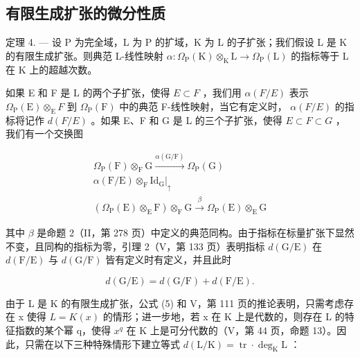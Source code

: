 \subsection{有限生成扩张的微分性质}

定理 4. --- 设 P 为完全域，L 为 P 的扩域，K 为 L 的子扩张；我们假设 L 是 K 的有限生成扩张。则典范 L-线性映射 \(\alpha: \Omega_{\mathrm{P}}(\mathrm{K}) \otimes_{\mathrm{K}} \mathrm{L} \to \Omega_{\mathrm{P}}(\mathrm{L})\) 的指标等于 L 在 K 上的超越次数。

如果 E 和 F 是 L 的两个子扩张，使得 \(E \subset F\) ，我们用 \(\alpha(F/E)\) 表示 \(\Omega_{\mathrm{P}}(\mathrm{E}) \otimes_{\mathrm{E}} F\) 到 \(\Omega_{\mathrm{P}}(\mathrm{F})\) 中的典范 F-线性映射，当它有定义时， \(\alpha(F/E)\) 的指标将记作 \(d(F/E)\) 。如果 E、F 和 G 是 L 的三个子扩张，使得 \(E \subset F \subset G\) ，我们有一个交换图

\[
\begin{array}{c} \Omega_ {\mathrm{P}} (\mathrm{F}) \otimes_ {\mathrm{F}} \mathrm{G} \xrightarrow {\alpha (\mathrm{G} / \mathrm{F})} \Omega_ {\mathrm{P}} (\mathrm{G}) \\ \alpha (\mathrm{F} / \mathrm{E}) \otimes_ {\mathrm{F}} \mathrm{Id} _ {\mathrm{G}} \Bigg | _ {\uparrow} \\ (\Omega_ {\mathrm{P}} (\mathrm{E}) \otimes_ {\mathrm{E}} \mathrm{F}) \otimes_ {\mathrm{F}} \mathrm{G} \xrightarrow {\beta} \Omega_ {\mathrm{P}} (\mathrm{E}) \otimes_ {\mathrm{E}} \mathrm{G} \end{array}
\]

其中 \(\beta\) 是命题 2（II，第 278 页）中定义的典范同构。由于指标在标量扩张下显然不变，且同构的指标为零，引理 2（V，第 133 页）表明指标 \(d(\mathrm{G}/\mathrm{E})\) 在 \(d(\mathrm{F}/\mathrm{E})\) 与 \(d(\mathrm{G}/\mathrm{F})\) 皆有定义时有定义，并且此时

\[
d (\mathrm{G} / \mathrm{E}) = d (\mathrm{G} / \mathrm{F}) + d (\mathrm{F} / \mathrm{E}).\tag{5}
\]

由于 L 是 K 的有限生成扩张，公式 (5) 和 V，第 111 页的推论表明，只需考虑存在 x 使得 \(L = K(x)\) 的情形；进一步地，若 x 在 K 上是代数的，则存在 L 的特征指数的某个幂 q，使得 \(x^{q}\) 在 K 上是可分代数的（V，第 44 页，命题 13）。因此，只需在以下三种特殊情形下建立等式 \(d(\mathrm{L}/\mathrm{K}) = \operatorname{tr} \cdot \deg_{\mathrm{K}} \mathrm{L}\) ：

